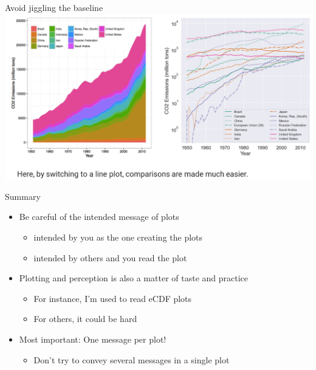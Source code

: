 \documentclass[aspectratio=169]{../latex_main/tntbeamer}  %
\begin{document}
	
	
	\begin{frame}{Avoid jiggling the baseline}
	        \centering
	        \includegraphics[scale=.35]{Bild79}

	\end{frame}
	
	
	
	\begin{frame}{Summary}
    	 
    	 \begin{itemize}
    	     \item Be careful of the intended message of plots
    	     \begin{itemize}
    	         \item intended by you as the one creating the plots
    	         \item intended by others and you read the plot
    	     \end{itemize}
    	     \smallskip
    	     \item Plotting and perception is also a matter of taste and practice
    	     \begin{itemize}
    	         \item For instance, I'm used to read eCDF plots
    	         \item For others, it could be hard
    	     \end{itemize}
    	     \smallskip
    	     \item Most important: \alert{One message per plot!}
    	     \begin{itemize}
    	         \item Don't try to convey several messages in a single plot
    	     \end{itemize}
    	 \end{itemize}
    	 
	\end{frame}
	
\end{document}
